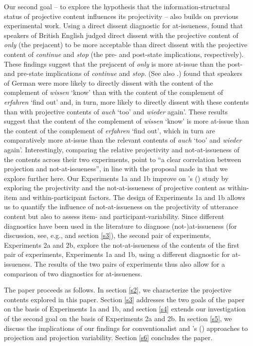 \documentclass[11pt,fleqn]{article}
\newcommand{\6}{\mbox{$[\hspace*{-.6mm}[$}}
\newcommand{\9}{\mbox{$]\hspace*{-.6mm}]$}}
\newcommand{\citetpos}[1]{\citeauthor{#1}'s (\citeyear{#1})}
\begin{document}
Our second goal -- to explore the hypothesis that the information-structural status of projective content influences its projectivity -- also builds on previous experimental work. 
 Using a direct dissent diagnostic for at-issueness, \citet{amaral-etal11} found that speakers of British English judged direct dissent with the projective content of {\em only} (the prejacent) to be more acceptable than direct dissent with the projective content of {\em continue} and {\em stop} (the pre- and post-state implications, respectively). These findings suggest that the prejacent of {\em only} is more at-issue than the post- and pre-state implications of {\em continue} and {\em stop}. (See also \citealt{cummins-etal2012}.) \citet{xue-onea11} found that speakers of German were more likely to directly dissent with the content of the complement of {\em wissen} `know' than with the content of the complement of {\em erfahren} `find out' and, in turn, more likely to directly dissent with these contents than with projective contents of {\em auch} `too' and {\em wieder} again'. These results suggest that the content of the complement of {\em wissen} `know' is more at-issue than the content of the complement of {\em erfahren} `find out', which in turn are comparatively more at-issue than the relevant contents of {\em auch} `too' and {\em wieder} again'. Interestingly, comparing the relative projectivity and not-at-issueness 
of the contents across their two experiments, \citet[180]{xue-onea11} point to ``a clear correlation between projection and not-at-issueness'', in line with the proposal made in \citealt{brst-salt10} that we explore further here. Our Experiments 1a and 1b improve on \citetpos{xue-onea11} study by exploring the projectivity and the not-at-issueness of projective content as within-item and within-participant factors. The design of Experiments 1a and 1b allows us to quantify the influence of not-at-issueness on the projectivity of utterance content but also to assess item- and participant-variability. Since different diagnostics have been used in the literature to diagnose (not-)at-issueness (for discussion, see, e.g., \citealt{tonhauser-sula6} and section \ref{s3}), the second pair of experiments, Experiments 2a and 2b, explore the not-at-issueness of the contents of the first pair of experiments, Experiments 1a and 1b, using a different diagnostic for at-issueness. The results of the two pairs of experiments thus also allow for a comparison of two diagnostics for at-issueness.

The paper proceeds as follows. In section \ref{s2}, we characterize the projective contents explored in this paper. Section \ref{s3} addresses the two goals of the paper on the basis of Experiments 1a and 1b, and section \ref{s4} extends our investigation of the second goal on the basis of Experiments 2a and 2b. In section \ref{s5}, we discuss the implications of our findings for conventionalist and \citetpos{brst-salt10} approaches to projection and projection variability. Section \ref{s6} concludes the paper.
\end{document}
